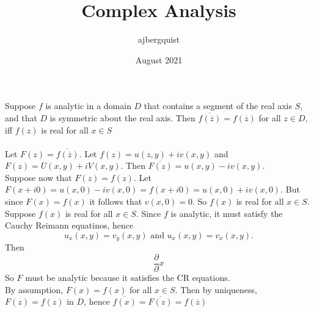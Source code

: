 \documentclass{article}
\title{Complex Analysis}
\author{ajbergquist }
\date{August 2021}
\newcommand{\pder}[]{\frac{\partial}{\partial}}
\begin{document}
 Suppose $f$ is analytic in a domain $D$ that contains a segment of the real axis $S$, and that $D$ is symmetric about the real axis. Then $\overline{f(\overline{z})} = f(\overline{z})$ for all $z\in D$, iff $f(z)$ is real for all $x\in S$ \\
 \\

Let $F(z) = \overline{f(\overline{z})}$. Let $f(z) = u(z,y) + iv(x,y)$ and $F(z) = U(x,y)+i V(x,y)$. Then $\overline{F(z)} = u(x,y) - iv(x,y)$. \\

Suppose now that $F(z) = f(z)$. Let $F(x+i0) = u(x,0)- iv(x,0) = f(x+i0) = u(x,0) + iv(x,0).$ But since $F(x) = f(x)$ it follows that $v(x,0) = 0$. So $f(x)$ is real for all $x\in S$.\\

Suppose $f(x)$ is real for all $x\in S$. Since $f$ is analytic, it must satisfy the Cauchy Reimann equatinos, hence
$$u_x(x,y) = v_y(x,y)\mbox{ and }u_x(x,y) = v_x(x,y).$$ Then 
$$ \pder{x}$$
So $F$ must be analytic because it satisfies the CR equations.\\
By assumption, $F(x) = f(x)$ for all $x\in S$. Then by uniqueness, $F(z) = f(z)$ in $D$, hence $\overline{f(x)} = \overline{F(z)} = f(\overline{z})$
\end{document}

